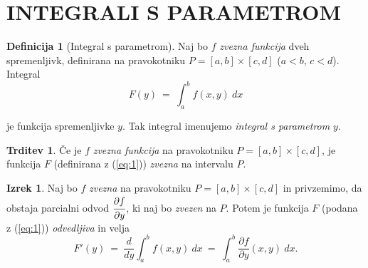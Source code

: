 \documentclass[11pt]{article}
\theoremstyle{definition}
\newtheorem{definicija}{Definicija}[section]
\theoremstyle{definition}
\newtheorem{trditev}{Trditev}[section]
\theoremstyle{definition}
\newtheorem{izrek}{Izrek}[section]
\begin{document}

\pagebreak


\section{INTEGRALI S PARAMETROM}
\vspace{0.5cm}


\begin{definicija}[Integral s parametrom]

Naj bo $f$ \textit{zvezna funkcija} dveh spremenljivk, definirana na pravokotniku $P = [a, b] \times [c, d]$ ($a < b$, $c < d$). Integral
\begin{equation}
\label{eq:1}
	F(y) ~=~ \int_{a}^{b} f(x, y) ~dx
\end{equation}

je funkcija spremenljivke $y$. Tak integral imenujemo \textit{integral s parametrom} $y$.

\end{definicija}
\vspace{0.5cm}

\begin{trditev}

Če je $f$ \textit{zvezna funkcija} na pravokotniku $P = [a, b] \times [c, d]$, je funkcija $F$ (definirana z (\ref{eq:1})) \textit{zvezna} na intervalu $P$.

\end{trditev}
\vspace{0.5cm}

\begin{izrek}

Naj bo $f$ \textit{zvezna} na pravokotniku $P = [a, b] \times [c, d]$ in privzemimo, da obstaja parcialni odvod $\cfrac{\partial f}{\partial y}$, ki naj bo \textit{zvezen} na $P$. Potem je funkcija $F$ (podana z (\ref{eq:1})) \textit{odvedljiva} in velja 
\begin{equation}
	F'(y) ~=~ \frac{d}{dy} \int_{a}^{b} f(x, y) ~dx ~=~ \int_{a}^{b} \frac{\partial f}{\partial y} (x, y) ~dx.
\end{equation}

\end{izrek}
\vspace{0.5cm}
\end{document}
